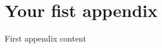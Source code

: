 \documentclass{UIdahoMastersThesis}
\begin{document}
\clearpage
\appendix  %

\chapter{Your fist appendix}
First appendix content

% 

% 
\end{document}
